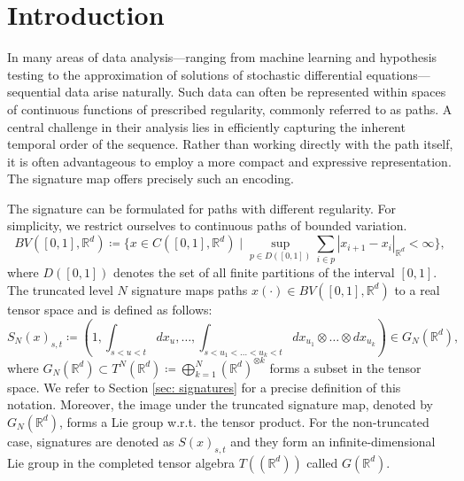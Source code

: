 \documentclass[pdflatex,sn-mathphys-num]{sn-jnl}
\theoremstyle{thmstyletwo}
\theoremstyle{thmstyleone}
\theoremstyle{thmstyletwo}
\newcommand{\R}{\mathbb{R}}
\begin{document}
	
	
	\maketitle

    \section{Introduction}\label{sec1}

In many areas of data analysis---ranging from machine learning and hypothesis testing to the approximation of solutions of stochastic differential equations---sequential data arise naturally. Such data can often be represented within spaces of continuous functions of prescribed regularity, commonly referred to as paths. A central challenge in their analysis lies in efficiently capturing the inherent temporal order of the sequence. Rather than working directly with the path itself, it is often advantageous to employ a more compact and expressive representation. The signature map offers precisely such an encoding.

The signature can be formulated for paths with different regularity. For simplicity, we restrict ourselves to continuous paths of bounded variation.  
\begin{equation*}
    BV([0,1],\R^d)\coloneqq \bigg\{x\in C([0,1],\R^d)\;\big|\;\sup_{p\in D([0,1])} \sum_{i\in p} |x_{i+1}-x_i|_{\R^d} <\infty \bigg\} ,
\end{equation*}
where $D([0,1])$ denotes the set of all finite partitions of the interval $[0,1]$. The truncated level $N$ signature maps paths $x(\cdot) \in BV([0,1],\R^d)$ to a real tensor space and is defined as follows:
\begin{equation*}
    S_N(x)_{s, t} \coloneqq\left(1, \int_{s<u<t} d x_u, \ldots, \int_{s<u_1<\ldots<u_k<t} d x_{u_1} \otimes \ldots \otimes d x_{u_k}\right)\in G_N(\R^d),
\end{equation*}
where $G_N(\R^d) \subset T^N(\R^d)\coloneqq \bigoplus_{k=1}^N (\R^d)^{\otimes k}$ forms a subset in the tensor space. We refer to Section \ref{sec: signatures} for a precise definition of this notation. Moreover, the image under the truncated signature map, denoted by $G_N(\R^d)$, forms a Lie group w.r.t. the tensor product. For the non-truncated case, signatures are denoted as $S(x)_{s,t}$ and they form an infinite-dimensional Lie group in the completed tensor algebra $T((\R^d))$ called $G(\R^d)$. 
\end{document}
